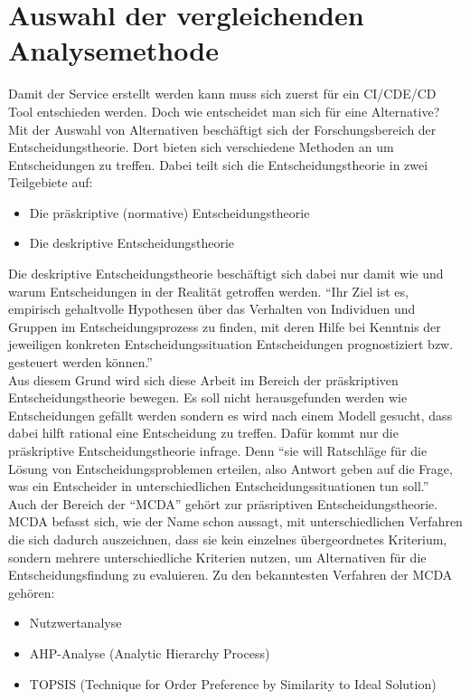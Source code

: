 \section{Auswahl der vergleichenden Analysemethode}
Damit der Service erstellt werden kann muss sich zuerst für ein \ac{CI}/\ac{CDE}/\ac{CD} Tool entschieden werden. Doch wie entscheidet man sich für eine Alternative? Mit der Auswahl von Alternativen beschäftigt sich der Forschungsbereich der Entscheidungstheorie. Dort bieten sich verschiedene Methoden an um Entscheidungen zu treffen. Dabei teilt sich die Entscheidungstheorie in zwei Teilgebiete auf\autocite[Vgl.][S.1]{Laux.2014}:
\begin{itemize}
	\item Die präskriptive (normative) Entscheidungstheorie
	\item Die deskriptive Entscheidungstheorie 
\end{itemize}
Die deskriptive Entscheidungstheorie beschäftigt sich dabei nur damit wie und warum Entscheidungen in der Realität getroffen werden. \enquote{Ihr Ziel ist es, empirisch gehaltvolle Hypothesen über das Verhalten von Individuen und Gruppen im Entscheidungsprozess zu finden, mit deren Hilfe bei Kenntnis der jeweiligen konkreten Entscheidungssituation Entscheidungen prognostiziert bzw. gesteuert werden können.}\autocite[S.4]{Laux.2014}\\
Aus diesem Grund wird sich diese Arbeit im Bereich der präskriptiven Entscheidungstheorie bewegen. Es soll nicht herausgefunden werden wie Entscheidungen gefällt werden sondern es wird nach einem Modell gesucht, dass dabei hilft rational eine Entscheidung zu treffen. Dafür kommt nur die präskriptive Entscheidungstheorie infrage. Denn \enquote{sie will Ratschläge für die Lösung von Entscheidungsproblemen erteilen, also Antwort geben auf die Frage, was ein Entscheider in unterschiedlichen Entscheidungssituationen tun soll.}\autocite[S.4]{Laux.2014} \\
Auch der Bereich der \enquote{\ac{MCDA}} gehört zur präsriptiven Entscheidungstheorie. \ac{MCDA} befasst sich, wie der Name schon aussagt, mit unterschiedlichen Verfahren die sich dadurch auszeichnen, dass sie kein einzelnes übergeordnetes Kriterium, sondern mehrere unterschiedliche Kriterien nutzen, um Alternativen für die Entscheidungsfindung zu evaluieren. Zu den bekanntesten Verfahren der \ac{MCDA} gehören:
\begin{itemize}
	\item Nutzwertanalyse
	\item AHP-Analyse (Analytic Hierarchy Process)
	\item TOPSIS (Technique for Order Preference by Similarity to Ideal Solution)
\end{itemize}
